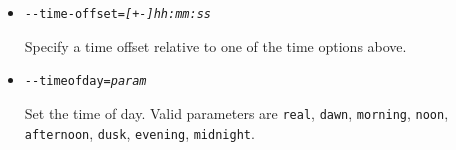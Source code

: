 {\begin{itemize}
  The option {-$ $-time-match-local} takes care of this by computing the timezone
  difference between your real world time zone and the position of your virtual
  flight, and local clocks are synchronized.

  Incompatible with \texttt{-$ $-start-date-gmt}, \texttt{-$ $-start-date-lat}, \texttt{-$ $-start-date-sys}.

  \item{\texttt{-$ $-time-offset={\it [+-]hh:mm:ss}}}

  Specify a time offset relative to one of the time options above.

  \item{\texttt{-$ $-timeofday={\it param}}}

  Set the time of day. Valid parameters are \texttt{real}, \texttt{dawn}, \texttt{morning},
  \texttt{noon}, \texttt{afternoon}, \texttt{dusk}, \texttt{evening}, \texttt{midnight}.

  \end{itemize}
}

